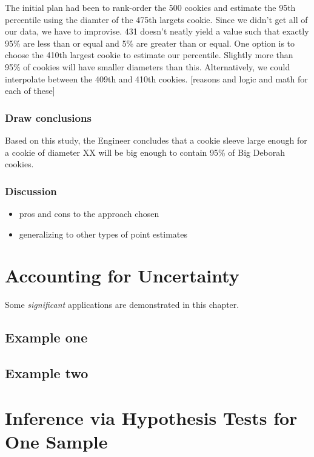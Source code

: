 \documentclass[]{book}
\providecommand{\tightlist}{%
  \setlength{\itemsep}{0pt}\setlength{\parskip}{0pt}}
\begin{document}
The initial plan had been to rank-order the 500 cookies and estimate the
95th percentile using the diamter of the 475th largets cookie. Since we
didn't get all of our data, we have to improvise. 431 doesn't neatly
yield a value such that exactly 95\% are less than or equal and 5\% are
greater than or equal. One option is to choose the 410th largest cookie
to estimate our percentile. Slightly more than 95\% of cookies will have
smaller diameters than this. Alternatively, we could interpolate between
the 409th and 410th cookies. {[}reasons and logic and math for each of
these{]}

\subsection{Draw conclusions}\label{draw-conclusions-2}

Based on this study, the Engineer concludes that a cookie sleeve large
enough for a cookie of diameter XX will be big enough to contain 95\% of
Big Deborah cookies.

\subsection{Discussion}\label{discussion}

\begin{itemize}
\tightlist
\item
  pros and cons to the approach chosen
\item
  generalizing to other types of point estimates
\end{itemize}

\chapter{Accounting for Uncertainty}\label{accounting-for-uncertainty}

Some \emph{significant} applications are demonstrated in this chapter.

\section{Example one}\label{example-one}

\section{Example two}\label{example-two}

\chapter{Inference via Hypothesis Tests for One Sample}\label{HT}
\end{document}
